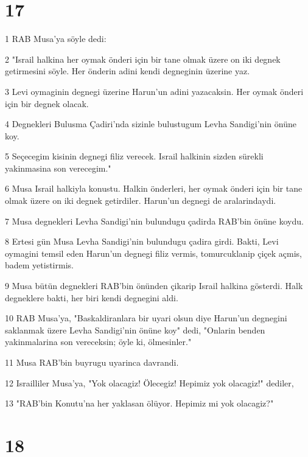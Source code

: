 \chapter{17}

\par 1 RAB Musa'ya söyle dedi:
\par 2 "Israil halkina her oymak önderi için bir tane olmak üzere on iki degnek getirmesini söyle. Her önderin adini kendi degneginin üzerine yaz.
\par 3 Levi oymaginin degnegi üzerine Harun'un adini yazacaksin. Her oymak önderi için bir degnek olacak.
\par 4 Degnekleri Bulusma Çadiri'nda sizinle bulustugum Levha Sandigi'nin önüne koy.
\par 5 Seçecegim kisinin degnegi filiz verecek. Israil halkinin sizden sürekli yakinmasina son verecegim."
\par 6 Musa Israil halkiyla konustu. Halkin önderleri, her oymak önderi için bir tane olmak üzere on iki degnek getirdiler. Harun'un degnegi de aralarindaydi.
\par 7 Musa degnekleri Levha Sandigi'nin bulundugu çadirda RAB'bin önüne koydu.
\par 8 Ertesi gün Musa Levha Sandigi'nin bulundugu çadira girdi. Bakti, Levi oymagini temsil eden Harun'un degnegi filiz vermis, tomurcuklanip çiçek açmis, badem yetistirmis.
\par 9 Musa bütün degnekleri RAB'bin önünden çikarip Israil halkina gösterdi. Halk degneklere bakti, her biri kendi degnegini aldi.
\par 10 RAB Musa'ya, "Baskaldiranlara bir uyari olsun diye Harun'un degnegini saklanmak üzere Levha Sandigi'nin önüne koy" dedi, "Onlarin benden yakinmalarina son vereceksin; öyle ki, ölmesinler."
\par 11 Musa RAB'bin buyrugu uyarinca davrandi.
\par 12 Israilliler Musa'ya, "Yok olacagiz! Ölecegiz! Hepimiz yok olacagiz!" dediler,
\par 13 "RAB'bin Konutu'na her yaklasan ölüyor. Hepimiz mi yok olacagiz?"

\chapter{18}

